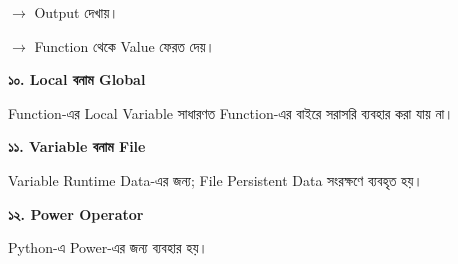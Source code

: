 \begin{trapbox}
\(\rightarrow\)
Output দেখায়।

\(\rightarrow\)
Function থেকে Value ফেরত দেয়।

\medskip

\textbf{\color{deepOrange}১০. Local বনাম Global}

Function-এর Local Variable সাধারণত Function-এর বাইরে সরাসরি ব্যবহার করা যায় না।

\medskip

\textbf{\color{deepOrange}১১. Variable বনাম File}

Variable Runtime Data-এর জন্য; File Persistent Data সংরক্ষণে ব্যবহৃত হয়।

\medskip

\textbf{\color{deepOrange}১২. Power Operator}

Python-এ Power-এর জন্য \py{**} ব্যবহার হয়।

\end{trapbox}


